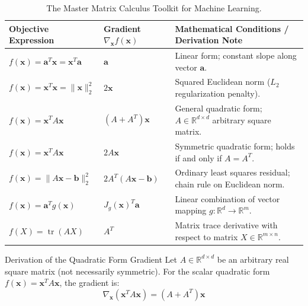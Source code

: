 \begin{table}[htbp]
\centering
\small
\begin{tabularx}{\textwidth}{llX}
\toprule
\textbf{Objective Expression} & \textbf{Gradient $\nabla_{\mathbf{x}} f(\mathbf{x})$} & \textbf{Mathematical Conditions / Derivation Note} \\
\midrule
$f(\mathbf{x}) = \mathbf{a}^T \mathbf{x} = \mathbf{x}^T \mathbf{a}$ & $\mathbf{a}$ & Linear form; constant slope along vector $\mathbf{a}$. \\
\addlinespace
$f(\mathbf{x}) = \mathbf{x}^T \mathbf{x} = \|\mathbf{x}\|_2^2$ & $2\mathbf{x}$ & Squared Euclidean norm ($L_2$ regularization penalty). \\
\addlinespace
$f(\mathbf{x}) = \mathbf{x}^T A \mathbf{x}$ & $(A + A^T)\mathbf{x}$ & General quadratic form; $A \in \mathbb{R}^{d \times d}$ arbitrary square matrix. \\
\addlinespace
$f(\mathbf{x}) = \mathbf{x}^T A \mathbf{x}$ & $2A\mathbf{x}$ & Symmetric quadratic form; holds if and only if $A = A^T$. \\
\addlinespace
$f(\mathbf{x}) = \|A\mathbf{x} - \mathbf{b}\|_2^2$ & $2A^T(A\mathbf{x} - \mathbf{b})$ & Ordinary least squares residual; chain rule on Euclidean norm. \\
\addlinespace
$f(\mathbf{x}) = \mathbf{a}^T g(\mathbf{x})$ & $J_g(\mathbf{x})^T \mathbf{a}$ & Linear combination of vector mapping $g: \mathbb{R}^d \to \mathbb{R}^m$. \\
\addlinespace
$f(X) = \operatorname{tr}(A X)$ & $A^T$ & Matrix trace derivative with respect to matrix $X \in \mathbb{R}^{m \times n}$. \\
\bottomrule
\end{tabularx}
\caption{The Master Matrix Calculus Toolkit for Machine Learning.}
\label{tab:matrix_calculus_toolkit}
\end{table}

\begin{theorembox}{Derivation of the Quadratic Form Gradient}
Let $A \in \mathbb{R}^{d \times d}$ be an arbitrary real square matrix (not necessarily symmetric). For the scalar quadratic form $f(\mathbf{x}) = \mathbf{x}^T A \mathbf{x}$, the gradient is:
\begin{equation}
\nabla_{\mathbf{x}} (\mathbf{x}^T A \mathbf{x}) = (A + A^T)\mathbf{x}
\label{eq:quad_form_deriv}
\end{equation}
\end{theorembox}

